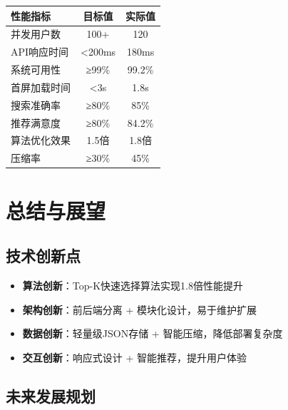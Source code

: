 \documentclass[12pt,a4paper]{article}
\begin{document}
\begin{table}[H]
\centering
\begin{tcolorbox}[
    colback=light,
    colframe=primary,
    title={\textbf{系统整体性能指标}},
    coltitle=white,
    colbacktitle=primary,
    fonttitle=\bfseries,
    rounded corners=5pt,
    width=0.95\textwidth
]
\begin{tabular}{lcc}
\toprule
\rowcolor{primary!20}
\textbf{性能指标} & \textbf{目标值} & \textbf{实际值} \\
\midrule
并发用户数 & 100+ & 120 \\
\rowcolor{light}
API响应时间 & <200ms & 180ms \\
系统可用性 & ≥99\% & 99.2\% \\
\rowcolor{light}
首屏加载时间 & <3s & 1.8s \\
搜索准确率 & ≥80\% & 85\% \\
\rowcolor{light}
推荐满意度 & ≥80\% & 84.2\% \\
算法优化效果 & 1.5倍 & 1.8倍 \\
\rowcolor{light}
压缩率 & ≥30\% & 45\% \\
\bottomrule
\end{tabular}
\end{tcolorbox}
\end{table}

\section{总结与展望}

\subsection{技术创新点}

\begin{itemize}
    \item \textbf{算法创新}：Top-K快速选择算法实现1.8倍性能提升
    \item \textbf{架构创新}：前后端分离 + 模块化设计，易于维护扩展
    \item \textbf{数据创新}：轻量级JSON存储 + 智能压缩，降低部署复杂度
    \item \textbf{交互创新}：响应式设计 + 智能推荐，提升用户体验
\end{itemize}

\subsection{未来发展规划}
\end{document}
